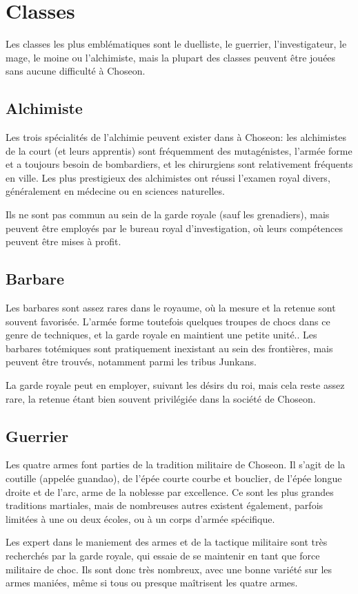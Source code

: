 \documentclass[10pt,a4paper]{book}
\newcommand{\nomroyaume}{Choseon}
\begin{document}
\section{Classes}
Les classes les plus emblématiques sont le duelliste, le guerrier, l'investigateur, le mage, le moine ou l'alchimiste, mais la plupart des classes peuvent être jouées sans aucune difficulté à \nomroyaume.
\subsection{Alchimiste}
Les trois spécialités de l'alchimie peuvent exister dans à \nomroyaume: les alchimistes de la court (et leurs apprentis) sont fréquemment des mutagénistes, l'armée forme et a toujours besoin de bombardiers, et les chirurgiens sont relativement fréquents en ville. Les plus prestigieux des alchimistes ont réussi l'examen royal divers, généralement en médecine ou en sciences naturelles.

Ils ne sont pas commun au sein de la garde royale (sauf les grenadiers), mais peuvent être employés par le bureau royal d'investigation, où leurs compétences peuvent être mises à profit.
\subsection{Barbare}
Les barbares sont assez rares dans le royaume, où la mesure et la retenue sont souvent favorisée. L'armée forme toutefois quelques troupes de chocs dans ce genre de techniques, et la garde royale en maintient une petite unité.. Les barbares totémiques sont pratiquement inexistant au sein des frontières, mais peuvent être trouvés, notamment parmi les tribus Junkans.

La garde royale peut en employer, suivant les désirs du roi, mais cela reste assez rare, la retenue étant bien souvent privilégiée dans la société de \nomroyaume.
\subsection{Guerrier}
Les quatre armes font parties de la tradition militaire de \nomroyaume . Il s'agit de la coutille (appelée guandao), de l'épée courte courbe et bouclier, de l'épée longue droite et de l'arc, arme de la noblesse par excellence. Ce sont les  plus grandes traditions martiales, mais de nombreuses autres existent également, parfois limitées à une ou deux écoles, ou à un corps d'armée spécifique.

Les expert dans le maniement des armes et de la tactique militaire sont très recherchés par la garde royale, qui essaie de se maintenir en tant que force militaire de choc. Ils sont donc très nombreux, avec une bonne variété sur les armes maniées, même si tous ou presque maîtrisent les quatre armes.
\end{document}

